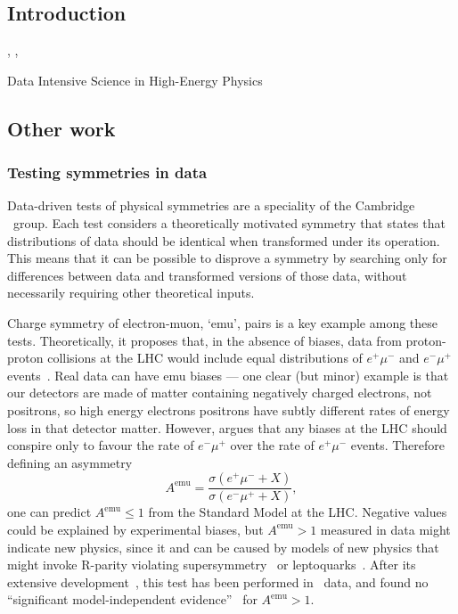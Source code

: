 \setcounter{chapter}{-1}
\begin{singlespacing}
\chapter{Introduction}
\label{chapter:introduction}
%
\begin{epigraphs}
\qitem{%
\TODO{}}%
{\TODO{},
\textit{\TODO{}},
\TODO{}}
\end{epigraphs}
\end{singlespacing}

Data Intensive Science in High-Energy Physics

\section{Other work}


\subsection{Testing symmetries in data}
Data-driven tests of physical symmetries are a speciality of the Cambridge
\atlas\ group.
Each test considers a theoretically motivated symmetry that states that
distributions of data should be identical when transformed under its operation.
This means that it can be possible to disprove a symmetry by searching only
for differences between data and transformed versions of those data, without
necessarily requiring other theoretical inputs.

Charge symmetry of electron-muon, `emu', pairs is a key example among these
tests.
Theoretically, it proposes that, in the absence of biases, data
from proton-proton collisions at the LHC would include equal distributions
of $e^+\mu^-$ and $e^-\mu^+$ events~\cite{Lester:2016qdv}.
Real data can have emu biases --- one clear (but minor) example is that our
detectors are made of matter containing negatively charged electrons, not
positrons, so high energy electrons positrons have subtly different rates of
energy loss in that detector matter.
However, \cite{Lester:2016qdv} argues that any biases at the LHC should
conspire only to favour the rate of $e^-\mu^+$ over the rate of $e^+\mu^-$
events.
Therefore defining an asymmetry
\begin{equation}
A^\mathrm{emu} = \frac{
\sigma(e^+\mu^- + X)
}{
\sigma(e^-\mu^+ + X)
}
,
\end{equation}
one can predict $A^\mathrm{emu} \leq 1$ from the Standard Model at the LHC.
Negative values could be explained by experimental biases, but
$A^\mathrm{emu} > 1$ measured in data might indicate new physics, since it and
can be caused by models of new physics that might invoke R-parity violating
supersymmetry~\cite{Lester:2016qdv} or leptoquarks~\cite{EXOT-2018-29}.
After its extensive development~\cite{Brunt:2674708,Pacey:2747774},
this test has been performed in \atlas\ data, and found no ``significant
model-independent evidence''~\cite{EXOT-2018-29} for $A^\mathrm{emu} > 1$.

